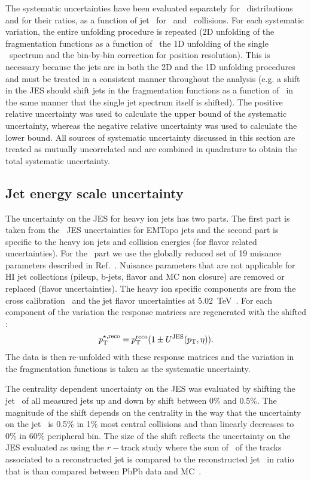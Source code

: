 The systematic uncertainties have been evaluated separately for \Dptr\ distributions and for their ratios, as a function of jet \pT\ for \pp\ and \pbpb\ collisions. 
For each systematic variation, the entire unfolding procedure is repeated (2D unfolding of the fragmentation
functions as a function of \ptjet\, the 1D unfolding of the single \ptjet\ spectrum and the bin-by-bin correction for position resolution). This is necessary because the jets are in both the 2D and the 1D unfolding procedures and must be treated in a consistent manner throughout the analysis (e.g. a shift in the JES should 
shift jets in the fragmentation functions as a function of \ptjet\ in the same manner
that the single jet spectrum itself is shifted).
The positive relative uncertainty was used to calculate the upper bound of the systematic uncertainty, whereas the negative relative uncertainty was used to calculate the lower bound. All sources of systematic uncertainty discussed in this section are treated as mutually uncorrelated and are combined in quadrature to obtain the total systematic uncertainty. 

\subsection{Jet energy scale uncertainty}

The uncertainty on the JES for heavy ion jets has two parts.  The first part is taken from
the \pp\ JES uncertainties for EMTopo jets and the second part is specific to the heavy ion jets
and collision energies (for flavor related uncertainties).  For the \pp\ part we use the globally reduced
set of 19 nuisance parameters described in Ref.~\cite{JESuncertaintytwiki}. Nuisance parameters that are not applicable for HI jet collections (pileup, b-jets, flavor and MC non closure) are removed or replaced (flavor uncertainties). The heavy ion specific components are from the cross calibration~\cite{cc2015} and the jet
flavor uncertainties at 5.02~TeV~\cite{pPbIntNote}.  For each component of the variation
the response matrices are regenerated with the shifted \ptjet:
\begin{equation}
   \pT^{\star,\mathrm{reco}} = \pT^{\mathrm{reco}} (1\pm U^{\mathrm{JES}}(\pT , \eta)).
\end{equation}
The data is then re-unfolded with these response matrices and the variation in the fragmentation 
functions is taken as the systematic uncertainty.

 The centrality dependent uncertainty on the JES was evaluated by shifting the jet \pt\ of all measured jets up and down by shift between 0\% and 0.5\%. The magnitude of the shift depends on the centrality in the way that the uncertainty on the jet \pt\ is 0.5\% in 1\% most central collisions and than linearly decreases to 0\% in 60\% peripheral bin. The size of the shift reflects the uncertainty on the JES evaluated as using the $r-$track study where the sum of \pT\ of the tracks associated to a reconstructed jet is compared to the reconstructed jet \pT\ in ratio that is than compared between PbPb data and MC~\cite{HIjesnote,PbPbRaaNote}.

